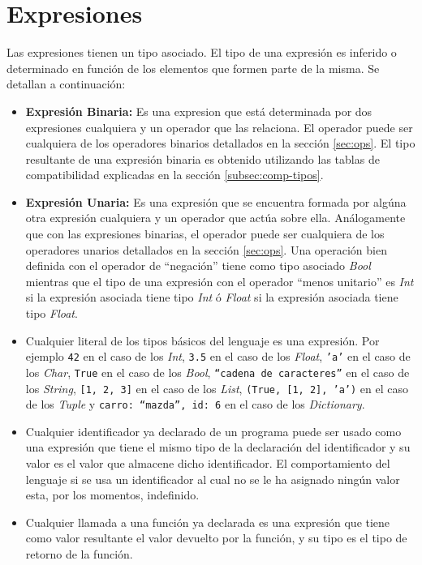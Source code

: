 \documentclass[12pt, spanish]{report}
\begin{document}
\chapter{Expresiones}
\label{sec:expr}

Las expresiones tienen un tipo asociado. El tipo de una expresi\'on es
inferido o determinado en funci\'on de los elementos que formen parte
de la misma. Se detallan a continuaci\'on:

\begin{itemize}
\item \textbf{Expresi\'on Binaria:} Es una expresion que est\'a
  determinada por dos expresiones cualquiera y un operador que las
  relaciona. El operador puede ser cualquiera de los operadores
  binarios detallados en la secci\'on \ref{sec:ops}. El tipo
  resultante de una expresi\'on binaria es obtenido utilizando las
  tablas de compatibilidad explicadas en la secci\'on \ref{subsec:comp-tipos}.

\item \textbf{Expresi\'on Unaria:} Es una expresi\'on que se encuentra
  formada por alg\'una otra expresi\'on cualquiera y un operador que
  act\'ua sobre ella. An\'alogamente que con las expresiones binarias,
  el operador puede ser cualquiera de los operadores unarios
  detallados en la secci\'on \ref{sec:ops}. Una operaci\'on bien
  definida con el operador de ``negaci\'on'' tiene como tipo asociado
  \emph{Bool} mientras que el tipo de una expresi\'on con el operador
  ``menos unitario'' es \emph{Int} si la expresi\'on asociada tiene tipo
  \emph{Int} \'o \emph{Float} si la expresi\'on asociada tiene tipo
  \emph{Float}.

\item Cualquier literal de los tipos b\'asicos del lenguaje es una
  expresi\'on. Por ejemplo \texttt{42} en el caso de los \emph{Int},
  \texttt{3.5} en el caso de los \emph{Float}, \texttt{'a'} en el caso
  de los \emph{Char}, \texttt{True} en el caso de los \emph{Bool},
  \texttt{``cadena de caracteres''} en el caso de los \emph{String},
  \texttt{[1, 2, 3]} en el caso de los \emph{List}, \texttt{(True, [1,
    2], 'a')} en el caso de los \emph{Tuple} y \texttt{{carro:
      ``mazda'', id: 6}} en el caso de los \emph{Dictionary}.

\item Cualquier identificador ya declarado de un programa puede ser
  usado como una expresi\'on que tiene el mismo tipo de la
  declaraci\'on del identificador y su valor es el valor que almacene
  dicho identificador. El comportamiento del lenguaje si se usa un
  identificador al cual no se le ha asignado ning\'un valor esta, por
  los momentos, indefinido.

\item Cualquier llamada a una funci\'on ya declarada es una
  expresi\'on que tiene como valor resultante el valor devuelto por la
  funci\'on, y su tipo es el tipo de retorno de la funci\'on.
\end{itemize}
\end{document}
